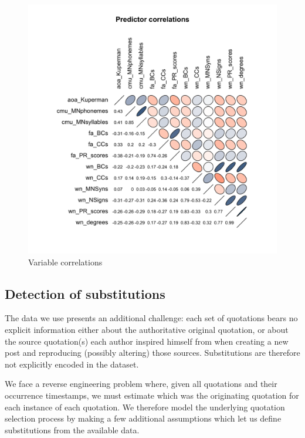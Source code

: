 \begin{figure}[!th]
    \includegraphics[width=\linewidth]{algorithms/Rplot.pdf}
    \caption{Variable correlations }
\end{figure}

\subsection{Detection of substitutions}

The data we use presents an additional challenge: each set of quotations bears no explicit information either about the authoritative original quotation, or about the source quotation(s) each author inspired himself from when creating a new post and reproducing (possibly altering) those sources.
Substitutions are therefore not explicitly encoded in the dataset.

We face a reverse engineering problem where, given all quotations and their occurrence timestamps, we must estimate which was the originating quotation for each instance of each quotation.
We therefore model the underlying quotation selection process by making a few additional assumptions which let us define substitutions from the available data.

